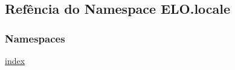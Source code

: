 \hypertarget{namespaceELO_1_1locale}{\subsection{Refência do Namespace E\-L\-O.\-locale}
\label{namespaceELO_1_1locale}
}
\subsubsection*{Namespaces}
\begin{DoxyCompactItemize}
\item 
\hyperlink{namespaceELO_1_1locale_1_1index}{index}
\end{DoxyCompactItemize}
